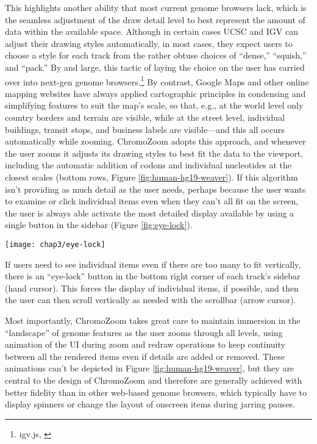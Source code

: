 This highlights another ability that most current genome browsers lack, which is the seamless adjustment of the draw detail level to best represent the amount of data within the available space. Although in certain cases UCSC and IGV can adjust their drawing styles automatically, in most cases, they expect users to choose a style for each track from the rather obtuse choices of ``dense,'' ``squish,'' and ``pack.'' By and large, this tactic of laying the choice on the user has carried over into next-gen genome browsers.\footnote{igv.js, \textcite{Buels2016,Down2011,Vanderkam2016}} By contrast, Google Maps and other online mapping websites have always applied cartographic principles in condensing and simplifying features to suit the map's scale, so that, e.g., at the world level only country borders and terrain are visible, while at the street level, individual buildings, transit stops, and business labels are visible—and this all occurs automatically while zooming. ChromoZoom adopts this approach, and whenever the user zooms it adjusts its drawing styles to best fit the data to the viewport, including the automatic addition of codons and individual nucleotides at the closest scales (bottom rows, Figure \ref{fig:human-hg19-weaver}). If this algorithm isn't providing as much detail as the user needs, perhaps because the user wants to examine or click individual items even when they can't all fit on the screen, the user is always able activate the most detailed display available by using a single button in the sidebar (Figure \ref{fig:eye-lock}).

\begin{marginfigure}
  \texttt{[image: chap3/eye-lock]}               
  \caption[Forcing the most detailed display mode]{If users need to see individual items even if there are too many to fit vertically, there is an ``eye-lock'' button in the bottom right corner of each track's sidebar (hand cursor). This forces the display of individual items, if possible, and then the user can then scroll vertically as needed with the scrollbar (arrow cursor).}
  \label{fig:eye-lock}
\end{marginfigure}

Most importantly, ChromoZoom takes great care to maintain immersion in the ``landscape'' of genome features as the user zooms through all levels, using animation of the UI during zoom and redraw operations to keep continuity between all the rendered items even if details are added or removed. These animations can't be depicted in Figure \ref{fig:human-hg19-weaver}, but they are central to the design of ChromoZoom and therefore are generally achieved with better fidelity than in other web-based genome browsers, which typically have to display spinners or change the layout of onscreen items during jarring pauses.

